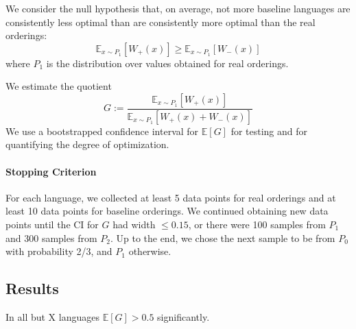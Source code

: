 \documentclass[11pt,letterpaper]{article}
\newcommand{\E}[0]{\mathbb{E}}
\begin{document}
We consider the null hypothesis that, on average, not more baseline languages are consistently less optimal than are consistently more optimal than the real orderings:
\begin{equation}
	\E_{x \sim P_1}[W_+(x)] \geq \E_{x \sim P_1}[W_-(x)]
\end{equation}
where $P_1$ is the distribution over values obtained for real orderings.

We estimate the quotient
\begin{equation}
	G :=	\frac{\E_{x \sim P_1}[W_+(x)]}{\E_{x \sim P_1}[W_+(x) + W_-(x)]}
\end{equation}
We use a bootstrapped confidence interval for $\E[G]$ for testing and for quantifying the degree of optimization.

%


\paragraph{Stopping Criterion}

For each language, we collected at least 5 data points for real orderings and at least 10 data points for baseline orderings.
We continued obtaining new data points until the CI for $G$ had width $\leq 0.15$, or there were 100 samples from $P_1$ and 300 samples from $P_2$.
Up to the end, we chose the next sample to be from $P_0$ with probability 2/3, and $P_1$ otherwise.

%



%
%



\subsection{Results}




In all but X languages $\E[G] > 0.5$ significantly.
\end{document}

